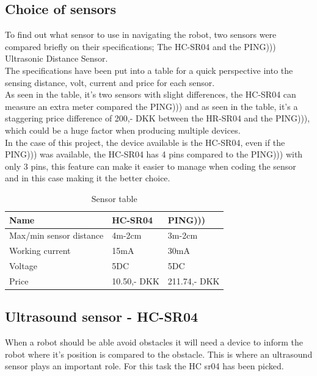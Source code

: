 \subsection{Choice of sensors}

To find out what sensor to use in navigating the robot, two sensors were compared briefly on their specifications; The HC-SR04 and the PING))) Ultrasonic Distance Sensor.\\
The specifications have been put into a table for a quick perspective into the sensing distance, volt, current and price for each sensor.\\

As seen in the table, it's two sensors with slight differences, the HC-SR04 can measure an extra meter compared the PING))) and as seen in the table, it's a staggering price difference of 200,- DKK between the HR-SR04 and the PING))), which could be a huge factor when producing multiple devices.\\

In the case of this project, the device available is the HC-SR04, even if the PING))) was available, the HC-SR04 has 4 pins compared to the PING))) with only 3 pins, this feature can make it easier to manage when coding the sensor and in this case making it the better choice.



\begin{table}[!ht]
\centering
\caption{Sensor table}
\label{Sensor table}
\begin{tabular}{|l|l|l|}
\hline
\textbf{Name}           & HC-SR04   & PING)))    \\ \hline
Max/min sensor distance & 4m-2cm    & 3m-2cm     \\ \hline
Working current         & 15mA      & 30mA       \\ \hline
Voltage                 & 5DC       & 5DC        \\ \hline
Price                   & 10.50,- DKK & 211.74,- DKK \\ \hline
\end{tabular}
\end{table}

\subsection{Ultrasound sensor - HC-SR04}
When a robot should be able avoid obstacles it will need a device to inform the robot where it's position is compared to the obstacle. This is where an ultrasound sensor plays an important role. For this task the HC sr04 has been picked.\\

